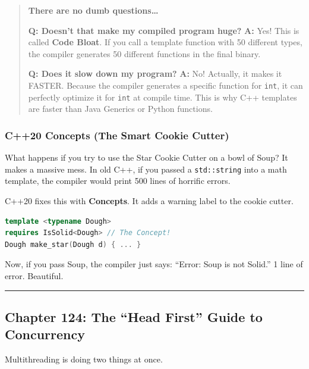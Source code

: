 \begin{quote}
\textbf{There are no dumb questions\ldots{}}

\textbf{Q: Doesn't that make my compiled program huge?} \textbf{A:} Yes!
This is called \textbf{Code Bloat}. If you call a template function with
50 different types, the compiler generates 50 different functions in the
final binary.

\textbf{Q: Does it slow down my program?} \textbf{A:} No! Actually, it
makes it FASTER. Because the compiler generates a specific function for
\passthrough{\lstinline!int!}, it can perfectly optimize it for
\passthrough{\lstinline!int!} at compile time. This is why C++ templates
are faster than Java Generics or Python functions.
\end{quote}

\hypertarget{c20-concepts-the-smart-cookie-cutter}{%
\subsubsection{C++20 Concepts (The Smart Cookie
Cutter)}\label{c20-concepts-the-smart-cookie-cutter}}

What happens if you try to use the Star Cookie Cutter on a bowl of Soup?
It makes a massive mess. In old C++, if you passed a
\passthrough{\lstinline!std::string!} into a math template, the compiler
would print 500 lines of horrific errors.

C++20 fixes this with \textbf{Concepts}. It adds a warning label to the
cookie cutter.

\begin{lstlisting}[language={C++}]
template <typename Dough>
requires IsSolid<Dough> // The Concept!
Dough make_star(Dough d) { ... }
\end{lstlisting}

Now, if you pass Soup, the compiler just says: ``Error: Soup is not
Solid.'' 1 line of error. Beautiful.

\begin{center}\rule{0.5\linewidth}{0.5pt}\end{center}

\hypertarget{chapter-124-the-head-first-guide-to-concurrency}{%
\subsection{Chapter 124: The ``Head First'' Guide to
Concurrency}\label{chapter-124-the-head-first-guide-to-concurrency}}

Multithreading is doing two things at once.

